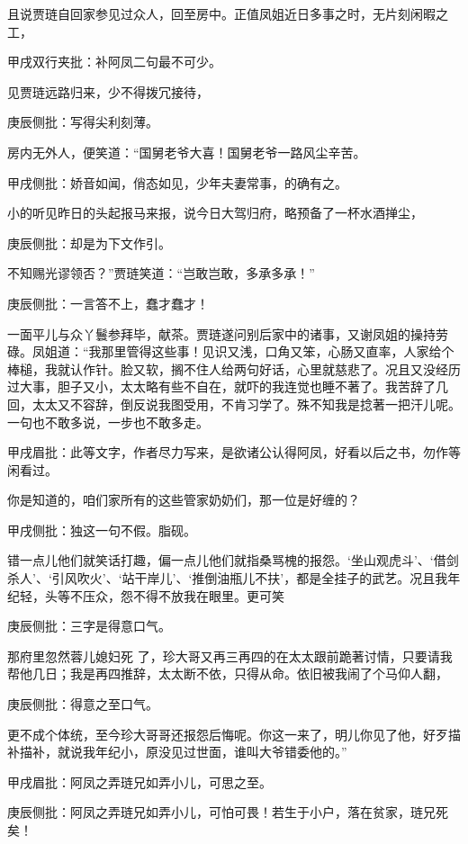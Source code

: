 \begin{parag}


    且说贾琏自回家参见过众人，回至房中。正值凤姐近日多事之时，无片刻闲暇之工，\begin{note}甲戌双行夹批：补阿凤二句最不可少。\end{note}见贾琏远路归来，少不得拨冗接待，\begin{note}庚辰侧批：写得尖利刻薄。\end{note}房内无外人，便笑道：“国舅老爷大喜！国舅老爷一路风尘辛苦。\begin{note}甲戌侧批：娇音如闻，俏态如见，少年夫妻常事，的确有之。\end{note}小的听见昨日的头起报马来报，说今日大驾归府，略预备了一杯水酒掸尘，\begin{note}庚辰侧批：却是为下文作引。\end{note}不知赐光谬领否？”贾琏笑道：“岂敢岂敢，多承多承！”\begin{note}庚辰侧批：一言答不上，蠢才蠢才！\end{note}一面平儿与众丫鬟参拜毕，献茶。贾琏遂问别后家中的诸事，又谢凤姐的操持劳碌。凤姐道：“我那里管得这些事！见识又浅，口角又笨，心肠又直率，人家给个棒槌，我就认作针。脸又软，搁不住人给两句好话，心里就慈悲了。况且又没经历过大事，胆子又小，太太略有些不自在，就吓的我连觉也睡不著了。我苦辞了几回，太太又不容辞，倒反说我图受用，不肯习学了。殊不知我是捻著一把汗儿呢。一句也不敢多说，一步也不敢多走。\begin{note}甲戌眉批：此等文字，作者尽力写来，是欲诸公认得阿凤，好看以后之书，勿作等闲看过。\end{note}你是知道的，咱们家所有的这些管家奶奶们，那一位是好缠的？\begin{note}甲戌侧批：独这一句不假。脂砚。\end{note}错一点儿他们就笑话打趣，偏一点儿他们就指桑骂槐的报怨。‘坐山观虎斗’、‘借剑杀人’、‘引风吹火’、‘站干岸儿’、‘推倒油瓶儿不扶’，都是全挂子的武艺。况且我年纪轻，头等不压众，怨不得不放我在眼里。更可笑\begin{note}庚辰侧批：三字是得意口气。\end{note}那府里忽然蓉儿媳妇死 了，珍大哥又再三再四的在太太跟前跪著讨情，只要请我帮他几日；我是再四推辞，太太断不依，只得从命。依旧被我闹了个马仰人翻，\begin{note}庚辰侧批：得意之至口气。\end{note}更不成个体统，至今珍大哥哥还报怨后悔呢。你这一来了，明儿你见了他，好歹描补描补，就说我年纪小，原没见过世面，谁叫大爷错委他的。”\begin{note}甲戌眉批：阿凤之弄琏兄如弄小儿，可思之至。\end{note}\begin{note}庚辰侧批：阿凤之弄琏兄如弄小儿，可怕可畏！若生于小户，落在贫家，琏兄死矣！\end{note}
\end{parag}


